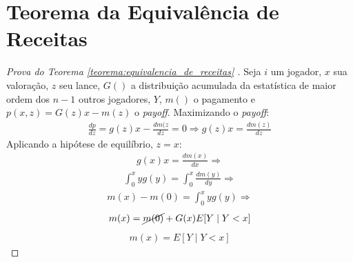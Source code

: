 \section{Teorema da Equivalência de Receitas}
\begin{proof}[Prova do Teorema \ref{teorema:equivalencia_de_receitas} \citet{krishna}]
	Seja $i$ um jogador, $x$ sua valoração, $z$ seu lance, $G()$ a distribuição acumulada da estatística de maior ordem dos $n-1$ outros jogadores, $Y$, $m()$ o pagamento e $p(x,z) = G(z)x - m(z)$ o \emph{payoff}. Maximizando o \emph{payoff}:
	\begin{align*}
		\frac{dp}{dz} = g(z)x - \frac{dm(z}{dz} = 0 \Rightarrow
		g(z)x = \frac{dm(z)}{dz}
	\end{align*}
	Aplicando a hipótese de equilíbrio, $z = x$:
	\begin{align*}
		g(x)x = \frac{dm(x)}{dx} \Rightarrow
	\end{align*}
	\begin{align*}
		\int_0^x yg(y) = \int_0^x \frac{dm(y)}{dy} \Rightarrow
	\end{align*}
	\begin{align*}
		m(x)-m(0) = \int_0^x yg(y) \Rightarrow
	\end{align*}
	\begin{align*}
		m(x) = \cancel{m(0)}+G(x)E[Y \mid Y < x]
	\end{align*}
	\begin{align*}
		m(x) = E[Y \mid Y < x]
	\end{align*}
\end{proof}

